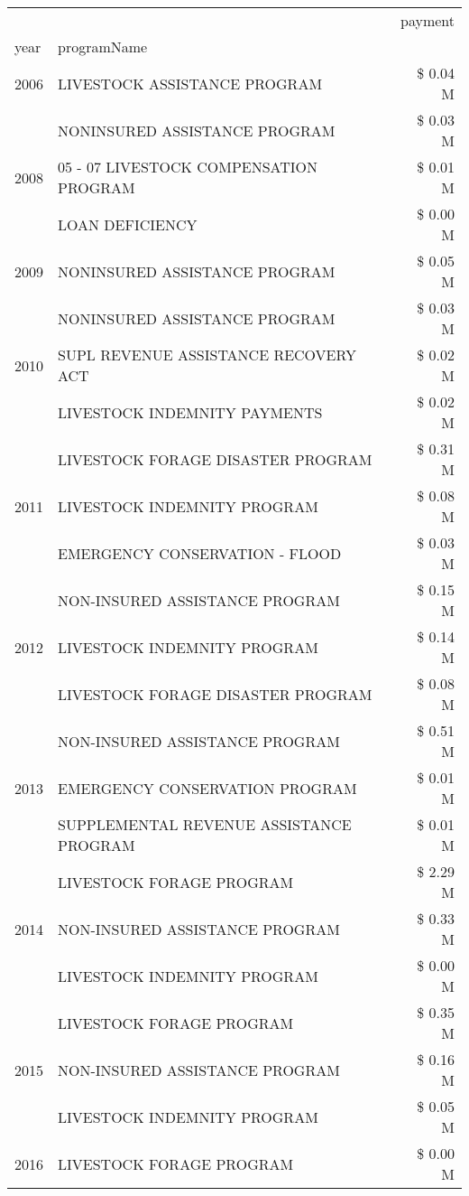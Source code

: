 \begin{tabular}{llr}
\toprule
 &  & payment \\
year & programName &  \\
\midrule
2006 & LIVESTOCK ASSISTANCE PROGRAM & \$ 0.04 M \\
\cline{1-3}
\multirow[t]{3}{*}{2008} & NONINSURED ASSISTANCE PROGRAM & \$ 0.03 M \\
 & 05 - 07 LIVESTOCK COMPENSATION PROGRAM & \$ 0.01 M \\
 & LOAN DEFICIENCY & \$ 0.00 M \\
\cline{1-3}
2009 & NONINSURED ASSISTANCE PROGRAM & \$ 0.05 M \\
\cline{1-3}
\multirow[t]{3}{*}{2010} & NONINSURED ASSISTANCE PROGRAM & \$ 0.03 M \\
 & SUPL REVENUE ASSISTANCE RECOVERY ACT & \$ 0.02 M \\
 & LIVESTOCK INDEMNITY PAYMENTS & \$ 0.02 M \\
\cline{1-3}
\multirow[t]{3}{*}{2011} & LIVESTOCK FORAGE DISASTER PROGRAM & \$ 0.31 M \\
 & LIVESTOCK INDEMNITY PROGRAM & \$ 0.08 M \\
 & EMERGENCY CONSERVATION - FLOOD & \$ 0.03 M \\
\cline{1-3}
\multirow[t]{3}{*}{2012} & NON-INSURED ASSISTANCE PROGRAM & \$ 0.15 M \\
 & LIVESTOCK INDEMNITY PROGRAM & \$ 0.14 M \\
 & LIVESTOCK FORAGE DISASTER PROGRAM & \$ 0.08 M \\
\cline{1-3}
\multirow[t]{3}{*}{2013} & NON-INSURED ASSISTANCE PROGRAM & \$ 0.51 M \\
 & EMERGENCY CONSERVATION PROGRAM & \$ 0.01 M \\
 & SUPPLEMENTAL REVENUE ASSISTANCE PROGRAM & \$ 0.01 M \\
\cline{1-3}
\multirow[t]{3}{*}{2014} & LIVESTOCK FORAGE PROGRAM & \$ 2.29 M \\
 & NON-INSURED ASSISTANCE PROGRAM & \$ 0.33 M \\
 & LIVESTOCK INDEMNITY PROGRAM & \$ 0.00 M \\
\cline{1-3}
\multirow[t]{3}{*}{2015} & LIVESTOCK FORAGE PROGRAM & \$ 0.35 M \\
 & NON-INSURED ASSISTANCE PROGRAM & \$ 0.16 M \\
 & LIVESTOCK INDEMNITY PROGRAM & \$ 0.05 M \\
\cline{1-3}
\multirow[t]{2}{*}{2016} & LIVESTOCK FORAGE PROGRAM & \$ 0.00 M \\

\end{tabular}
